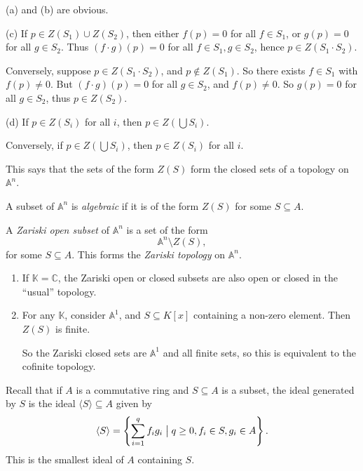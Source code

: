 \documentclass[12pt]{article}
\begin{document}
\begin{proofbox}


	(a) and (b) are obvious.

	(c) If $p \in Z(S_1) \cup Z(S_2)$, then either $f(p) = 0$ for all $f \in S_1$, or $g(p) = 0$ for all $g \in S_2$. Thus $(f \cdot g)(p) = 0$ for all $f \in S_1, g \in S_2$, hence $p \in Z(S_1 \cdot S_2)$.

	Conversely, suppose $p \in Z(S_1 \cdot S_2)$, and $p \not \in Z(S_1)$. So there exists $f \in S_1$ with $f(p) \neq 0$. But $(f \cdot g)(p) = 0$ for all $g \in S_2$, and $f(p) \neq 0$. So $g(p) = 0$ for all $g \in S_2$, thus $p \in Z(S_2)$.

	(d) If $p \in Z(S_i)$ for all $i$, then $p \in Z(\bigcup S_i)$.

	Conversely, if $p \in Z(\bigcup S_i)$, then $p \in Z(S_i)$ for all $i$.
\end{proofbox}

This says that the sets of the form $Z(S)$ form the closed sets of a topology on $\mathbb{A}^n$.

\begin{definition}
	A subset of $\mathbb{A}^n$ is \emph{algebraic} if it is of the form $Z(S)$ for some $S \subseteq A$.

	A \emph{Zariski open subset} of $\mathbb{A}^n$ is a set of the form
	\[
	\mathbb{A}^n \setminus Z(S),
	\]
	for some $S \subseteq A$. This forms the \emph{Zariski topology} on $\mathbb{A}^n$.
\end{definition}

\begin{exbox}
	\begin{enumerate}
		\item If $\mathbb{K} = \mathbb{C}$, the Zariski open or closed subsets are also open or closed in the ``usual'' topology.
		\item For any $\mathbb{K}$, consider $\mathbb{A}^1$, and $S \subseteq K[x]$ containing a non-zero element. Then $Z(S)$ is finite.

			So the Zariski closed sets are $\mathbb{A}^1$ and all finite sets, so this is equivalent to the cofinite topology.
	\end{enumerate}	
\end{exbox}

Recall that if $A$ is a commutative ring and $S \subseteq A$ is a subset, the ideal generated by $S$ is the ideal $\langle S \rangle \subseteq A$ given by
\[
	\langle S \rangle = \left\{ \sum_{i = 1}^q f_i g_i \bigm| q \geq 0, f_i \in S, g_i \in A\right\}.
\]
This is the smallest ideal of $A$ containing $S$.
\end{document}

